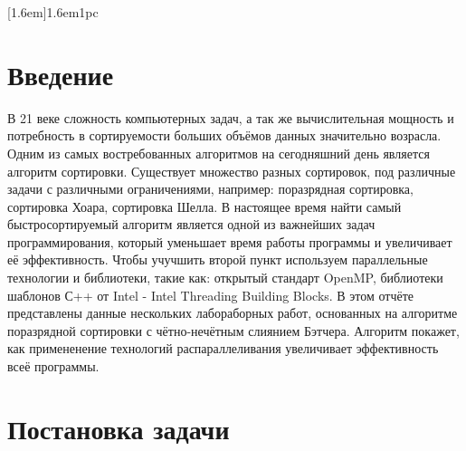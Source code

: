 \documentclass[a4paper,final]{report}
\begin{document}
	\begin{spacing}{1.5}  
		\renewcommand{\contentsname}{\centerline{\Large{Cодержание}}}
		[1.6em]{}{1.6em}{1pc}
		\tableofcontents
		\setcounter{page}{2}
		
		\newpage
		\section*{\centering Введение}

		
		\setlength{\parindent}{1.25cm}
		\setlength{\parskip}{8pt}
		
        \par
        В 21 веке сложность компьютерных задач, а так же вычислительная мощность и потребность в сортируемости больших объёмов данных значительно возрасла. Одним из самых востребованных алгоритмов на сегодняшний день является алгоритм сортировки. Существует множество разных сортировок, под различные задачи с различными ограничениями, например: поразрядная сортировка, сортировка Хоара, сортировка Шелла. В настоящее время найти самый быстросортируемый алгоритм является одной из важнейших задач программирования, который уменьшает время работы программы и увеличивает её эффективность. Чтобы учучшить второй пункт используем параллельные технологии и библиотеки, такие как: открытый стандарт OpenMP, библиотеки шаблонов С++ от Intel - Intel Threading Building Blocks.
        В этом отчёте представлены данные нескольких лабораборных работ, основанных на алгоритме поразрядной сортировки с чётно-нечётным слиянием Бэтчера. Алгоритм покажет, как примененение технологий распараллеливания увеличивает эффективность всеё программы.
		
		\newpage
		
		\renewcommand*{\thesection}{\arabic{section}}
		\section{Постановка задачи}
		

\end{spacing}
\end{document}

